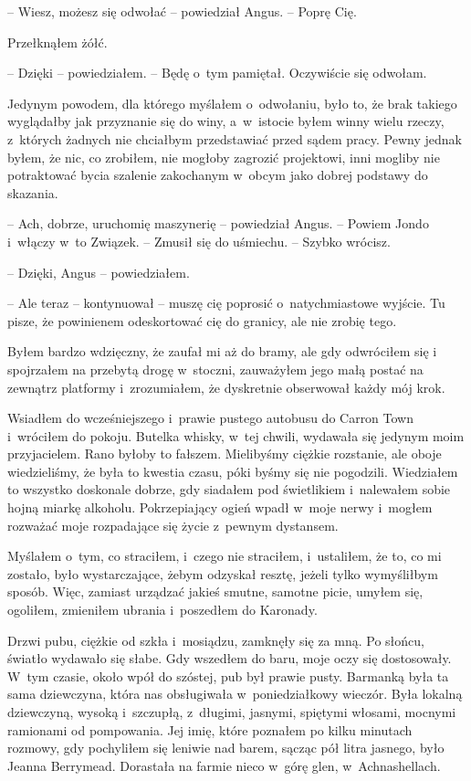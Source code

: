 \documentclass[oneside,polish,11pt,sfheadings]{mwbk}
\begin{document}
-- Wiesz, możesz się odwołać -- powiedział Angus. -- Poprę Cię.

Przełknąłem żółć. 

-- Dzięki -- powiedziałem. -- Będę o~tym pamiętał.
Oczywiście się odwołam.

Jedynym powodem, dla którego myślałem o~odwołaniu, było to, że brak
takiego wyglądałby jak przyznanie się do winy, a~w~istocie byłem winny
wielu rzeczy, z~których żadnych nie chciałbym przedstawiać przed sądem
pracy. Pewny jednak byłem, że nic, co zrobiłem, nie mogłoby zagrozić
projektowi, inni mogliby nie potraktować bycia szalenie zakochanym w~obcym jako dobrej podstawy do skazania.

-- Ach, dobrze, uruchomię maszynerię -- powiedział Angus. -- Powiem Jondo i~włączy w~to Związek. -- Zmusił się do uśmiechu. -- Szybko wrócisz.

-- Dzięki, Angus -- powiedziałem.

-- Ale teraz -- kontynuował -- muszę cię poprosić o~natychmiastowe wyjście.
Tu pisze, że powinienem odeskortować cię do granicy, ale nie zrobię
tego.

Byłem bardzo wdzięczny, że zaufał mi aż do bramy, ale gdy odwróciłem się
i spojrzałem na przebytą drogę w~stoczni, zauważyłem jego małą postać na
zewnątrz platformy i~zrozumiałem, że dyskretnie obserwował każdy mój
krok.

Wsiadłem do wcześniejszego i~prawie pustego autobusu do Carron Town i~wróciłem do pokoju. Butelka whisky, w~tej chwili, wydawała się jedynym
moim przyjacielem. Rano byłoby to fałszem. Mielibyśmy ciężkie rozstanie,
ale oboje wiedzieliśmy, że była to kwestia czasu, póki byśmy się nie
pogodzili. Wiedziałem to wszystko doskonale dobrze, gdy siadałem pod
świetlikiem i~nalewałem sobie hojną miarkę alkoholu. Pokrzepiający ogień
wpadł w~moje nerwy i~mogłem rozważać moje rozpadające się życie z~pewnym
dystansem.

Myślałem o~tym, co straciłem, i~czego nie straciłem, i~ustaliłem, że to,
co mi zostało, było wystarczające, żebym odzyskał resztę, jeżeli tylko
wymyśliłbym sposób. Więc, zamiast urządzać jakieś smutne, samotne picie,
umyłem się, ogoliłem, zmieniłem ubrania i~poszedłem do Karonady.

Drzwi pubu, ciężkie od szkła i~mosiądzu, zamknęły się za mną. Po słońcu,
światło wydawało się słabe. Gdy wszedłem do baru, moje oczy się
dostosowały. W~tym czasie, około wpół do szóstej, pub był prawie pusty.
Barmanką była ta sama dziewczyna, która nas obsługiwała w~poniedziałkowy
wieczór. Była lokalną dziewczyną, wysoką i~szczupłą, z~długimi, jasnymi,
spiętymi włosami, mocnymi ramionami od pompowania. Jej imię, które
poznałem po kilku minutach rozmowy, gdy pochyliłem się leniwie nad
barem, sącząc pół litra jasnego, było Jeanna Berrymead. Dorastała na
farmie nieco w~górę glen, w~Achnashellach.
\end{document}

